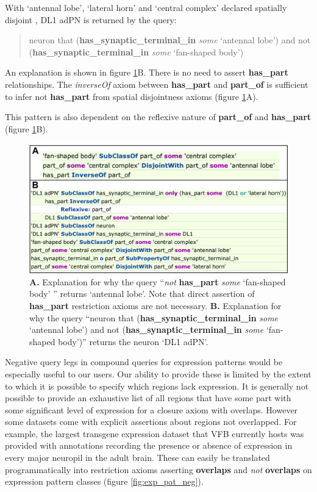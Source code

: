 \documentclass[runningheads,a4paper]{llncs}
\begin{document}
With `antennal lobe', `lateral horn' and  `central complex' declared
spatially disjoint , DL1 adPN is returned by the query:

\begin{quote}
neuron that (\textbf{has\_synaptic\_terminal\_in} \textit{some}
`antennal lobe') and not (\textbf{has\_synaptic\_terminal\_in}
\textit{some} `fan-shaped body')
\end{quote}

An explanation is shown in figure \ref{fig:combined_explanation}B.  There is no need to
assert \textbf{has\_part} relationships. The
\textit{inverseOf} axiom between \textbf{has\_part} and
\textbf{part\_of} is sufficient to infer not \textbf{has\_part} from
spatial disjointness axioms (figure \ref{fig:combined_explanation}A).

This pattern is also dependent on the reflexive nature of
\textbf{part\_of} and \textbf{has\_part} (figure \ref{fig:combined_explanation}B).

\begin{figure}
\centering
\includegraphics[width=120mm]{images/combined_explanation.png}
\caption{\textbf{A.} Explanation for why the query ``\textit{not}
   \textbf{has\_part} \textit{some} `fan-shaped body' '' returns
   `antennal lobe'.  Note that direct assertion of \textbf{has\_part}
   restriction axioms are not necessary. \textbf{B.} Explanation for
   why the query ``neuron that (\textbf{has\_synaptic\_terminal\_in}
   \textit{some} `antennal lobe') and not
   (\textbf{has\_synaptic\_terminal\_in} \textit{some} `fan-shaped
   body')'' returns the neuron `DL1 adPN'. }
\label{fig:combined_explanation}
\end{figure}

Negative query legs in compound queries for expression patterns would
be especially useful to our users.  Our ability to provide these is
limited by the extent to which it is possible to specify which regions
lack expression.  It is generally not possible to provide an
exhaustive list of all regions that have some part with some significant level of
expression for a closure axiom with overlaps.  However some datasets
come with explicit assertions about regions not overlapped.  For
example, the largest transgene expression dataset that VFB currently
hosts \cite{pmid23063364} was provided with annotations recording the
presence or absence of expression in every major neuropil in the adult
brain.  These can easily be translated programmatically into restriction axioms
asserting \textbf{overlaps} and \textit{not} \textbf{overlaps} on
expression pattern classes (figure \ref{fig:exp_pat_neg}).
\end{document}
